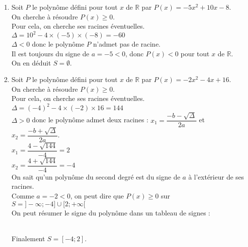 \documentclass[a4paper,11pt,exos]{nsi} %
\begin{document}
\begin{enumerate}
    \item Soit $P$ le polynôme défini pour tout $x$ de $\mathbb R$ par $P(x)=-5x^2+10x-8$.\\On cherche à résoudre $P(x)\geqslant 0$.\\Pour cela, on cherche ses racines éventuelles.\\$\Delta = 10^2-4\times(-5)\times(-8)=-60$\\$\Delta<0$ donc le polynôme $P$ n'admet pas de racine.\\ Il est toujours du signe de $a=-5<0$, donc $P(x)<0$ pour tout $x$ de $\mathbb{R}$.\\ On en déduit $S=\emptyset$.
    \item Soit $P$ le polynôme défini pour tout $x$ de $\mathbb R$ par $P(x)=-2x^2-4x+16$.\\On cherche à résoudre $P(x)\geqslant 0$.\\Pour cela, on cherche ses racines éventuelles.\\$\Delta = (-4)^2-4\times(-2)\times16=144$\\$\Delta>0$ donc  le polynôme admet deux racines : $x_1 = \dfrac{-b-\sqrt{\Delta}}{2a}$ et $x_2 = \dfrac{-b+\sqrt{\Delta}}{2a}$.\\$x_1 =\dfrac{4-\sqrt{144}}{-4}=2$\\$x_2 =\dfrac{4+\sqrt{144}}{-4}=-4$\\On sait qu'un polynôme du second degré est du signe de $a$ à l'extérieur de ses racines.\\Comme $a=-2<0$, on peut dire que $P(x)\geq 0$ sur $S=]-\infty;-4]\cup[2;+\infty[$\\On peut résumer le signe du polynôme dans un tableau de signes :\\
    \\ Finalement $S=[-4;2]$.
\end{enumerate}
\end{document}

